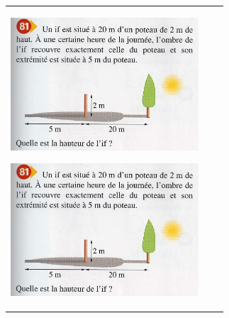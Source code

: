 \documentclass[12pt, twoside]{article}
\begin{document}
\begin{landscape}
\begin{tabular}{ccc}
\begin{minipage}{8cm}
\includegraphics[width=7cm]{images/ex81.jpg}


\includegraphics[width=7cm]{images/ex81.jpg}
\end{minipage}
\end{tabular}

\end{landscape}

\pagebreak
\end{document}
